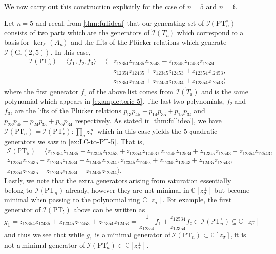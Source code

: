\documentclass[12pt, reqno]{amsart}
\numberwithin{equation}{section}
\theoremstyle{plain}
\theoremstyle{definition}
\newenvironment{example}
  {\pushQED{\qed}\renewcommand{\qedsymbol}{$\triangle$}\examplex}
  {\popQED\endexamplex}
\newcommand{\cc}{\mathbb{C}}
\newcommand{\zz}{\mathbb{Z}}
\newcommand{\ci}{\mathcal{I}}
\newcommand{\pt}{\mathrm{PT}}
\newcommand{\gr}{\mathrm{Gr}}
\begin{document}
We now carry out this construction explicitly for the case of $n = 5$ and $n = 6$. 

\begin{example}\label{example:fullideal5}
Let $n = 5$ and recall from \cref{thm:fullideal} that our generating set of $\ci(\mathrm{PT}_n^\circ)$ consists of two parts which are the generators of $\tilde{\ci}(T_n)$ which correspond to a basis for $\ker_\zz(A_n)$ and the lifts of the Pl\"ucker relations which generate $\ci(\gr(2, 5))$. In this case, 
\begin{align*}
\ci(\pt_5^\circ) = \langle f_1, f_2, f_3 \rangle =  \langle &z_{12354}z_{12435}z_{12543}-z_{12345}z_{12453}z_{12534} \\
&z_{12354}z_{12435}+z_{12345}z_{12453}+z_{12354}z_{12453},\\
&z_{12354}z_{12453}+z_{12453}z_{12534}+z_{12354}z_{12543} \rangle
\end{align*}
where the first generator $f_1$ of the above list comes from $\tilde{\ci(T_n)}$ and is the same polynomial which appears in \cref{example:toric-5}. The last two polynomials, $f_2$ and $f_3$, are the lifts of the Pl\"ucker relations $p_{13}p_{45} - p_{14}p_{35} + p_{15}p_{34}$ and $p_{23}p_{45} - p_{24}p_{35} + p_{25}p_{34}$ respectively. As stated in \cref{thm:fullideal}, we have $\ci(\pt_n) = \ci(\pt_n^\circ) : \prod_{\sigma} z_\sigma ^\infty$ which in this case yields the 5 quadratic generators we saw in \cref{ex:LC-to-PT-5}. That is, 
\begin{align*}
\ci(\pt_5) = 
\langle 
z_{12354}z_{12435}+z_{12345}z_{12453}+z_{12354}z_{12453}, z_{12345}z_{12534}+z_{12345}z_{12543}+z_{12354}z_{12543},\\
z_{12354}z_{12435}+z_{12345}z_{12534}+z_{12435}z_{12534}, z_{12345}z_{12453}+z_{12345}z_{12543}+z_{12435}z_{12543},\\
z_{12354}z_{12435}+z_{12345}z_{12534}+z_{12435}z_{12534} 
\rangle.
\end{align*}
Lastly, we note that the extra generators arising from saturation essentially belong to $\ci(\pt_n^\circ)$ already, however they are not minimal in $\cc[z_\sigma^\pm]$ but become minimal when passing to the polynomial ring $\cc[z_\sigma]$. For example, the first generator of $\ci(\pt_5)$ above can be written as
\[
g_1 = z_{12354}z_{12435}+z_{12345}z_{12453}+z_{12354}z_{12453} = \frac{1}{z_{12354}}f_1 + \frac{z_{12534}}{z_{12354}}f_2 \in \ci(\pt_n^\circ) \subseteq \cc[z_\sigma^\pm]
\]
and thus we see that while $g_1$ is a minimal generator of $\ci(\pt_n) \subset \cc[z_\sigma]$, it is not a minimal generator of $\ci(\pt_n^\circ) \subset \cc[z_\sigma^\pm]$.  
\end{example}
\end{document}
